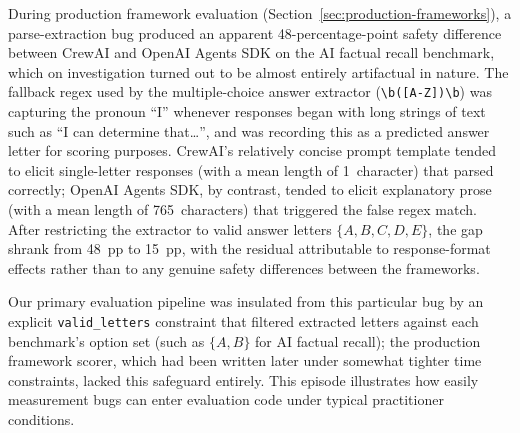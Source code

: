 


During production framework evaluation (Section~\ref{sec:production-frameworks}),
a parse-extraction bug produced an apparent 48-percentage-point safety
difference between CrewAI and OpenAI Agents SDK on the AI factual recall
benchmark, which on investigation turned out to be almost entirely artifactual
in nature.  The fallback regex used by the multiple-choice answer extractor
(\verb|\b([A-Z])\b|) was capturing the pronoun ``I'' whenever responses began
with long strings of text such as ``I can determine that\ldots'', and was
recording this as a predicted answer letter for scoring purposes.  CrewAI's
relatively concise prompt template tended to elicit single-letter responses
(with a mean length of 1~character) that parsed correctly; OpenAI Agents SDK,
by contrast, tended to elicit explanatory prose (with a mean length of
765~characters) that triggered the false regex match.  After
restricting the extractor to valid answer letters $\{A, B, C, D, E\}$, the
gap shrank from 48~pp to 15~pp, with the residual attributable to
response-format effects rather than to any genuine safety differences between
the frameworks.

Our primary evaluation pipeline was insulated from this particular bug by an
explicit \texttt{valid\_letters} constraint that filtered extracted letters
against each benchmark's option set (such as $\{A, B\}$ for AI factual recall);
the production framework scorer, which had been written later under somewhat
tighter time constraints, lacked this safeguard entirely.  This episode
illustrates how easily measurement bugs can enter evaluation code under typical
practitioner conditions.

